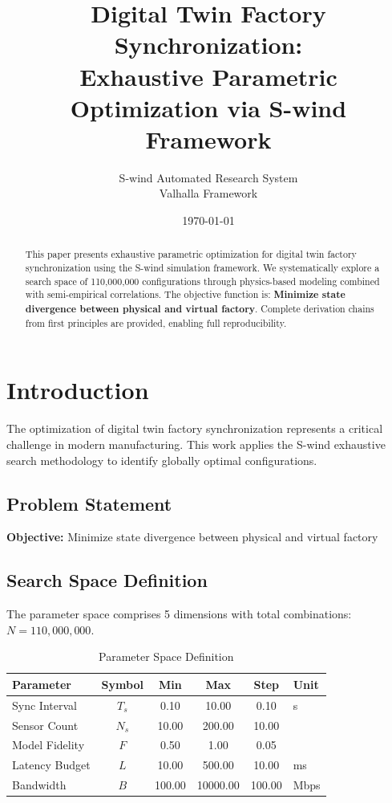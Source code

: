 \documentclass[11pt,twocolumn]{article}
\title{Digital Twin Factory Synchronization: \\Exhaustive Parametric Optimization via S-wind Framework}
\author{S-wind Automated Research System\\Valhalla Framework}
\date{\today}
\begin{document}
\maketitle

\begin{abstract}
This paper presents exhaustive parametric optimization for digital twin factory synchronization using the S-wind simulation framework.
We systematically explore a search space of 110,000,000 configurations through physics-based modeling
combined with semi-empirical correlations. The objective function is: \textbf{Minimize state divergence between physical and virtual factory}.
Complete derivation chains from first principles are provided, enabling full reproducibility.
\end{abstract}

\section{Introduction}
The optimization of digital twin factory synchronization represents a critical challenge in modern manufacturing.
This work applies the S-wind exhaustive search methodology to identify globally optimal configurations.

\subsection{Problem Statement}
\textbf{Objective:} Minimize state divergence between physical and virtual factory

\subsection{Search Space Definition}
The parameter space comprises 5 dimensions with total combinations: $N = 110,000,000$.

\begin{table}[h]
\centering
\caption{Parameter Space Definition}
\begin{tabular}{@{}lccccl@{}}
\toprule
Parameter & Symbol & Min & Max & Step & Unit \\
\midrule
Sync Interval & $T_s$ & 0.10 & 10.00 & 0.10 & s \\
Sensor Count & $N_s$ & 10.00 & 200.00 & 10.00 &  \\
Model Fidelity & $F$ & 0.50 & 1.00 & 0.05 &  \\
Latency Budget & $L$ & 10.00 & 500.00 & 10.00 & ms \\
Bandwidth & $B$ & 100.00 & 10000.00 & 100.00 & Mbps \\
\bottomrule
\end{tabular}
\end{table}
\end{document}
